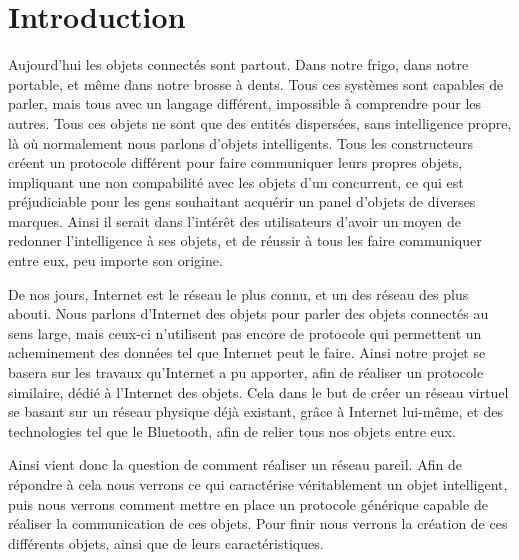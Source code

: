 \chapter*{Introduction}

Aujourd'hui les objets connectés sont partout. Dans notre frigo, dans notre portable, et même dans notre 
brosse à dents. Tous ces systèmes sont capables de parler, mais tous avec un langage différent, impossible à 
comprendre pour les autres. Tous ces objets ne sont que des entités dispersées, sans intelligence propre, là 
où normalement nous parlons d'objets intelligents. Tous les constructeurs créent un protocole différent pour 
faire communiquer leurs propres objets, impliquant une non compabilité avec les objets d'un concurrent, ce qui 
est préjudiciable pour les gens souhaitant acquérir un panel d'objets de diverses marques. Ainsi il serait 
dans l'intérêt des utilisateurs d'avoir un moyen de redonner l'intelligence à ses objets, et de réussir à tous 
les faire communiquer entre eux, peu importe son origine.

De nos jours, Internet est le réseau le plus connu, et un des réseau des plus abouti. Nous parlons d'Internet 
des objets pour parler des objets connectés au sens large, mais ceux-ci n'utilisent pas encore de protocole 
qui permettent un acheminement des données tel que Internet peut le faire. Ainsi notre projet se basera sur 
les travaux qu'Internet a pu apporter, afin de réaliser un protocole similaire, dédié à l'Internet des 
objets. Cela dans le but de créer un réseau virtuel se basant sur un réseau physique déjà existant, grâce à 
Internet lui-même, et des technologies tel que le Bluetooth, afin de relier tous nos objets entre eux. 

Ainsi vient donc la question de comment réaliser un réseau pareil. Afin de répondre à cela nous verrons 
ce qui caractérise véritablement un objet intelligent, puis nous verrons comment mettre en place un 
protocole générique capable de réaliser la communication de ces objets. Pour finir nous verrons la création 
de ces différents objets, ainsi que de leurs caractéristiques.